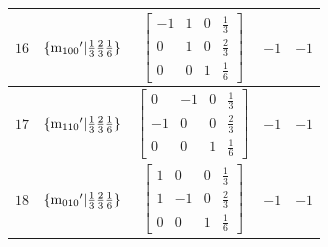 \documentclass[fleqn,8pt]{jsarticle}
\begin{document}
\begin{longtable}{ccccc}
$ 16 $ & $ \{{\rm m}_{100}{}'|\frac{1}{3} \frac{2}{3} \frac{1}{6}\} $ & $ \begin{bmatrix} -1 & 1 & 0 & \frac{1}{3} \\ 0 & 1 & 0 & \frac{2}{3} \\ 0 & 0 & 1 & \frac{1}{6} \end{bmatrix} $ & $ -1 $ & $ -1 $ \\ \hline
$ 17 $ & $ \{{\rm m}_{110}{}'|\frac{1}{3} \frac{2}{3} \frac{1}{6}\} $ & $ \begin{bmatrix} 0 & -1 & 0 & \frac{1}{3} \\ -1 & 0 & 0 & \frac{2}{3} \\ 0 & 0 & 1 & \frac{1}{6} \end{bmatrix} $ & $ -1 $ & $ -1 $ \\ \hline
$ 18 $ & $ \{{\rm m}_{010}{}'|\frac{1}{3} \frac{2}{3} \frac{1}{6}\} $ & $ \begin{bmatrix} 1 & 0 & 0 & \frac{1}{3} \\ 1 & -1 & 0 & \frac{2}{3} \\ 0 & 0 & 1 & \frac{1}{6} \end{bmatrix} $ & $ -1 $ & $ -1 $ \\
\end{longtable}
\end{document}
